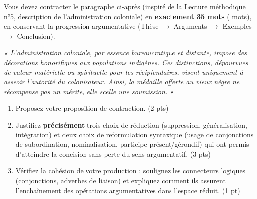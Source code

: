 \documentclass[11pt]{article}
\begin{document}
\begin{exercice}
Vous devez contracter le paragraphe ci-après (inspiré de la Lecture méthodique n°5, description de l'administration coloniale) en \textbf{exactement 35 mots} ( mots), en conservant la progression argumentative (Thèse $\rightarrow$ Arguments $\rightarrow$ Exemples $\rightarrow$ Conclusion).

\textit{« L'administration coloniale, par essence bureaucratique et distante, impose des décorations honorifiques aux populations indigènes. Ces distinctions, dépourvues de valeur matérielle ou spirituelle pour les récipiendaires, visent uniquement à asseoir l'autorité du colonisateur. Ainsi, la médaille offerte au vieux nègre ne récompense pas un mérite, elle scelle une soumission. »}

\begin{enumerate}
    \item Proposez votre proposition de contraction. (2 pts)
    \item Justifiez \textbf{précisément} trois choix de réduction (suppression, généralisation, intégration) et deux choix de reformulation syntaxique (usage de conjonctions de subordination, nominalisation, participe présent/gérondif) qui ont permis d'atteindre la concision sans perte du sens argumentatif. (3 pts)
    \item Vérifiez la cohésion de votre production : soulignez les connecteurs logiques (conjonctions, adverbes de liaison) et expliquez comment ils assurent l'enchaînement des opérations argumentatives dans l'espace réduit. (1 pt)
\end{enumerate}
\end{exercice}
\end{document}
